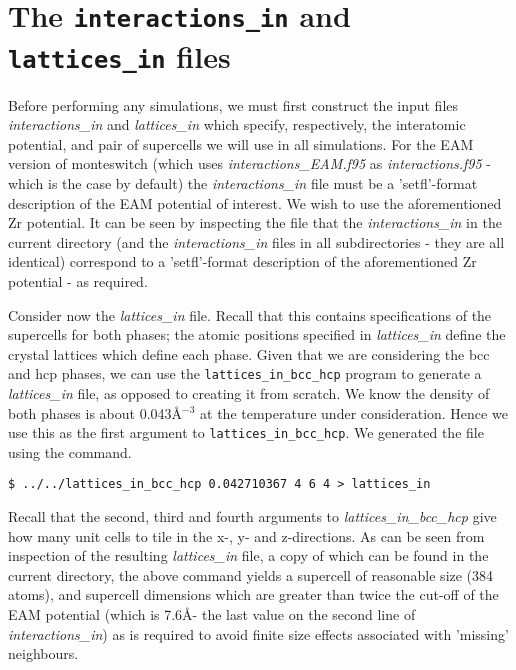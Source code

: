 \documentclass{report}
\begin{document}
\section{The \texttt{interactions\_in} and \texttt{lattices\_in} files}
Before performing any simulations, we must first construct the input files \emph{interactions\_in} and \emph{lattices\_in}
which specify, respectively, the interatomic potential, and pair of supercells we will use in all simulations. 
For the EAM version of monteswitch (which uses \emph{interactions\_EAM.f95} as \emph{interactions.f95} - which is the case by
default) the \emph{interactions\_in} file must be a 'setfl'-format description of the EAM potential of interest.
We wish to use the aforementioned Zr potential. It can be seen by inspecting the file that the 
\emph{interactions\_in} in the current directory (and the \emph{interactions\_in} files in all subdirectories - they 
are all identical) correspond to a 'setfl'-format description of the aforementioned Zr potential - as required.

Consider now the \emph{lattices\_in} file. Recall that this contains specifications of the supercells for both phases;
the atomic positions specified in \emph{lattices\_in} define the crystal lattices which define each phase.
Given that we are considering the bcc and hcp phases, we can use the \texttt{lattices\_in\_bcc\_hcp} program to generate
a \emph{lattices\_in} file, as opposed to creating it from scratch. We know the density of both phases is about
0.043\AA$^{-3}$ at the temperature under consideration. Hence we use this as the first argument to \texttt{lattices\_in\_bcc\_hcp}.
We generated the file using the command.
\begin{verbatim}
$ ../../lattices_in_bcc_hcp 0.042710367 4 6 4 > lattices_in
\end{verbatim}
Recall that the second, third and fourth arguments to \emph{lattices\_in\_bcc\_hcp} give how many unit cells to tile in the
x-, y- and z-directions. As can be seen from inspection of the resulting \emph{lattices\_in} file, a copy of which can be found in
the current directory, the above command yields a supercell of reasonable size (384 atoms), and supercell
dimensions which are greater than twice the cut-off of the EAM potential (which is 7.6\AA - the last value on the second
line of \emph{interactions\_in}) as is required to avoid finite size effects associated with 'missing' neighbours.
\end{document}
